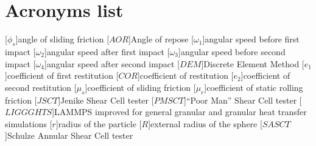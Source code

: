 
\section{Acronyms list}
\label{sec:acro}

		
\begin{acronym}[TDMA]

[$\phi_s$]{angle of sliding friction}
[$AOR$]{Angle of repose}
[$\omega_1$]{angular speed before first impact}
[$\omega_2$]{angular speed after first impact}
[$\omega_3$]{angular speed before second impact}
[$\omega_4$]{angular speed after second impact}
[$DEM$]{Discrete Element Method}
[$e_1$]{coefficient of first restitution}
[$COR$]{coefficient of restitution}
[$e_2$]{coefficient of second restitution}
[$\mu_s$]{coefficient of sliding friction}
[$\mu_r$]{coefficient of static rolling friction}
[$JSCT$]{Jenike Shear Cell tester}
[$PMSCT$]{``Poor Man'' Shear Cell tester}
[$LIGGGHTS$]{LAMMPS improved for general granular and granular heat transfer simulations}
[$r$]{radius of the particle}
[$R$]{external radius of the sphere}
[$SASCT$]{Schulze Annular Shear Cell tester}

\end{acronym}
